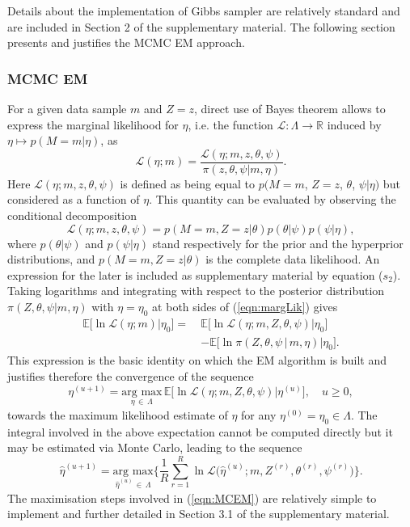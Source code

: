 \documentclass{bioinfo}
\begin{document}
Details about the implementation of Gibbs sampler are relatively
standard and are included in Section 2 of the supplementary
material. The following section presents and justifies the MCMC EM  
approach. 

\subsubsection{MCMC EM}\label{sec:MCMCEM}
For a given data sample $m$ and $Z = z$, direct use of Bayes theorem 
allows to  express the marginal likelihood for $\eta$, i.e. the
function $\mathcal L: \Lambda \to \mathbb R$ induced by $\eta 
\mapsto p(M=m|\eta)$, as
\begin{equation}
  \label{eqn:margLik}
  \mathcal L(\eta; m) 
  = \frac{\mathcal L(\eta; m, z, \theta, \psi)}{\pi(z,
      \theta, \psi|m, \eta)}.
\end{equation}
Here $\mathcal L(\eta; m, z, \theta, \psi)$ is 
defined as being equal to  $p(M=m$, $Z=z$, $\theta$,
$\psi|\eta)$ but considered as a function of $\eta$.  This quantity
can be evaluated by observing the conditional decomposition
\[
   \mathcal L(\eta; m, z, \theta, \psi) 
  = 
   p(M=m, Z=z|\theta) p(\theta|\psi)p(\psi|\eta), 
\]
where $p(\theta|\psi)$ and $p(\psi|\eta)$ stand respectively for the
prior and the hyperprior distributions, and $p(M=m, Z=z|\theta)$ is the
complete data likelihood. An expression for the later is included as 
supplementary material by equation ($s_2$). Taking
logarithms and integrating with respect to the posterior distribution
$\pi(Z, \theta, \psi|m, \eta)$ with $\eta = \eta_0$ at both sides of
(\ref{eqn:margLik}) gives 
\begin{align*}
   \mathbb E\big[\ln\mathcal L(\eta; m) \big| \eta_0\big] 
  =\ & 
  \mathbb E\big[\ln\mathcal L(\eta; m, Z, \theta, \psi)
    \big|  \eta_0\big]\\ 
     &-
  \mathbb E\big[\ln \pi(Z, \theta, \psi\,|\,m,\eta)\big| \eta_0\big].
\end{align*}  
This expression is the basic identity on which the EM algorithm is
built and justifies therefore the convergence of the sequence
\begin{equation}
 \label{eqn:EofMCEM}
  \eta^{(u+1)} = \underset{\eta\,\in\, \Lambda}{\text{arg max}}\, 
  \mathbb E\Big[\ln\mathcal L(\eta; m, Z, \theta, \psi)\big|
  \eta^{(u)}\Big], 
  \quad u\geq 0,
\end{equation}
towards the maximum likelihood estimate of $\eta$ for any $\eta^{(0)}
= \eta_0  \in \Lambda$. The integral involved in the above expectation
cannot be computed directly but it may be estimated via Monte Carlo,
leading to the sequence 
\begin{equation}
 \label{eqn:MCEM}
   \hat\eta^{(u+1)}
 = 
    \underset{\hat\eta^{(u)}\,\in\,\Lambda}{\text{arg max}} 
   \bigg\{
    \frac{1}{R}\sum_{r=1}^R 
      \ln\mathcal L\Big(\hat\eta^{(u)}; m, Z^{(r)}, \theta^{(r)},
      \psi^{(r)}\Big)
   \bigg\}.
\end{equation}
The maximisation steps involved in (\ref{eqn:MCEM}) are relatively
simple to implement and further detailed in Section 3.1 of the
supplementary material.
\end{document}
